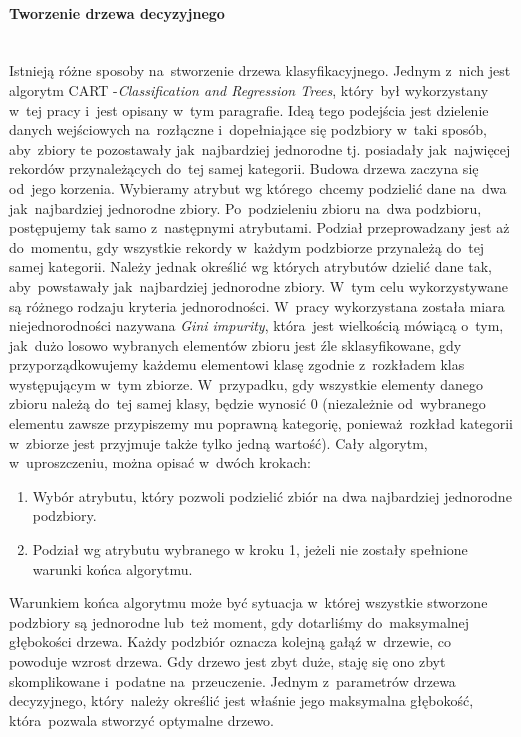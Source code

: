 \paragraph{Tworzenie drzewa decyzyjnego}\mbox{}\\
Istnieją różne sposoby na~stworzenie drzewa klasyfikacyjnego. Jednym z~nich jest algorytm CART -\textit{Classification  and  Regression  Trees}\cite{CART}, który~był wykorzystany w~tej pracy i~jest opisany w~tym paragrafie. Ideą tego podejścia jest dzielenie danych wejściowych na~rozłączne i~dopełniające się podzbiory w~taki sposób, aby~zbiory te pozostawały jak~najbardziej jednorodne tj. posiadały jak~najwięcej rekordów przynależących do~tej samej kategorii. Budowa drzewa zaczyna się od~jego korzenia. Wybieramy atrybut wg którego~chcemy podzielić dane na~dwa jak~najbardziej jednorodne zbiory. Po~podzieleniu zbioru na~dwa podzbioru, postępujemy tak samo z~następnymi atrybutami. Podział przeprowadzany jest aż do~momentu, gdy wszystkie rekordy w~każdym podzbiorze przynależą do~tej samej kategorii. Należy jednak określić wg których atrybutów dzielić dane tak, aby~powstawały jak~najbardziej jednorodne zbiory. W~tym celu wykorzystywane są różnego rodzaju kryteria jednorodności\cite{CART}. W~pracy wykorzystana została miara niejednorodności nazywana \textit{Gini impurity}, która~jest wielkością mówiącą o~tym, jak~dużo losowo wybranych elementów zbioru jest źle sklasyfikowane, gdy przyporządkowujemy każdemu elementowi klasę zgodnie z~rozkładem klas występującym w~tym zbiorze. W~przypadku, gdy wszystkie elementy danego zbioru należą do~tej samej klasy,  będzie wynosić 0 (niezależnie od~wybranego elementu zawsze przypiszemy mu poprawną kategorię, ponieważ~rozkład kategorii w~zbiorze jest przyjmuje także tylko jedną wartość). Cały algorytm, w~uproszczeniu, można opisać w~dwóch krokach:
\begin{enumerate}
\item Wybór atrybutu, który pozwoli podzielić zbiór na dwa najbardziej jednorodne podzbiory.
\item Podział wg atrybutu wybranego w kroku 1, jeżeli nie zostały spełnione warunki końca algorytmu.
\end{enumerate}
Warunkiem końca algorytmu może być sytuacja w~której wszystkie stworzone podzbiory są jednorodne lub~też moment, gdy dotarliśmy do~maksymalnej głębokości drzewa. Każdy podzbiór oznacza kolejną gałąź w~drzewie, co powoduje wzrost drzewa. Gdy drzewo jest zbyt duże, staję się ono zbyt skomplikowane i~podatne na~przeuczenie. Jednym z~parametrów drzewa decyzyjnego, który~należy określić jest właśnie jego maksymalna głębokość, która~pozwala stworzyć optymalne drzewo.

